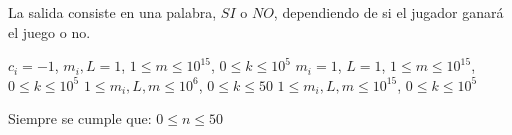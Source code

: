 \documentclass{oci}
\begin{document}
\begin{outputDescription}
La salida consiste en una palabra, $SI$ o $NO$, dependiendo de si el jugador ganará el juego o no.
\end{outputDescription}

\begin{scoreDescription}
   $c_i=-1$, $m_i, L=1$, $1\leq m \leq 10^{15}$, $0\leq k\leq 10^5$
   $m_i=1$, $L=1$, $1\leq m \leq 10^{15}$, $0\leq k\leq 10^5$
   $1\leq m_i, L, m\leq 10^{6}$, $0\leq k\leq 50$
   $1\leq m_i, L, m\leq 10^{15}$, $0\leq k\leq 10^5$
\end{scoreDescription}
Siempre se cumple que: 
$0\leq n\leq 50$\\

\begin{sampleDescription}
\end{sampleDescription}
\end{document}
